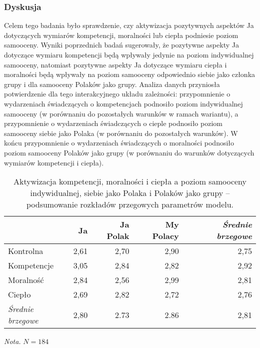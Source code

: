 \documentclass[man]{apa6}
\begin{document}
\subsubsection{Dyskusja}
Celem tego badania było sprawdzenie, czy aktywizacja pozytywnych aspektów Ja dotyczących wymiarów kompetencji, moralności lub ciepła podniesie poziom samooceny. Wyniki poprzednich badań sugerowały, że pozytywne aspekty Ja dotyczące wymiaru kompetencji będą wpływały jedynie na poziom indywidualnej samooceny, natomiast pozytywne aspekty Ja dotyczące wymiaru ciepła i moralności będą wpływały na poziom samooceny odpowiednio siebie jako członka grupy i dla samooceny Polaków jako grupy. Analiza danych przyniosła potwierdzenie dla tego interakcyjnego układu zależności: przypomnienie o wydarzeniach świadczących o kompetencjach podnosiło poziom indywidualnej samooceny (w porównaniu do pozostałych warunków w ramach wariantu), a przypomnienie o wydarzeniach świadczących o cieple podnosiło poziom samooceny siebie jako Polaka (w porównaniu do pozostałych warunków). W końcu przypomnienie o wydarzeniach świadczących o moralności podnosiło poziom samooceny Polaków jako grupy (w porównaniu do warunków dotyczących wymiarów kompetencji i ciepła). \\

\begin{table*}[htbp]
\vspace*{2em}
\centering
\begin{threeparttable}
\caption{Aktywizacja kompetencji, moralności i ciepła a poziom samooceny indywidualnej, siebie jako Polaka i Polaków jako grupy -- podsumowanie rozkładów przegowych parametrów modelu.}
\label{tab:3}
\bgroup
\def\arraystretch{0.85}
\begin{tabular}{lrrrr}
\midrule
                        & Ja        & Ja Polak  & My Polacy & \emph{Średnie brzegowe}\\
\midrule
Kontrolna               & 2,61      & 2,70      & 2,90      & 2,75 \\
Kompetencje             & 3,05      & 2,84      & 2,82      & 2,92 \\
Moralność               & 2,84      & 2,56      & 2,99      & 2,81 \\
Ciepło                  & 2,69      & 2,82      & 2,72      & 2,76 \\
\emph{Średnie brzegowe} & 2,80      & 2.73      & 2.86      & 2,81 \\

\bottomrule
\end{tabular}
\egroup
\begin{tablenotes}
{\small
\textit{Nota.} $N = 184$
}
\end{tablenotes}
\end{threeparttable}
\end{table*}
\end{document}
